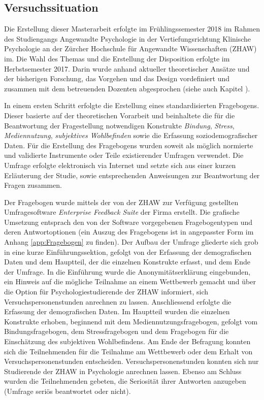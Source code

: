 \subsection{Versuchssituation}\label{sec:Versuchssituation}
Die Erstellung dieser Masterarbeit erfolgte im Frühlingssemester 2018 im Rahmen des Studiengangs Angewandte Psychologie in der Vertiefungsrichtung Klinische Psychologie an der Zürcher Hochschule für Angewandte Wissenschaften (ZHAW) im. Die Wahl des Themas und die Erstellung der Disposition erfolgte im Herbstsemester 2017. Darin wurde anhand aktueller theoretischer Ansätze und der bisherigen Forschung, das Vorgehen und das Design vordefiniert und zusammen mit dem betreuenden Dozenten abgesprochen (siehe auch Kapitel \textit{}). 

In einem ersten Schritt erfolgte die Erstellung eines standardisierten Fragebogens. Dieser basierte auf der theoretischen Vorarbeit und beinhaltete die für die Beantwortung der Fragestellung notwendigen Konstrukte \textit{Bindung}, \textit{Stress}, \textit{Mediennutzung}, \textit{subjektives Wohlbefinden} sowie die Erfassung soziodemografischer Daten. Für die Erstellung des Fragebogens wurden soweit als möglich normierte und validierte Instrumente oder Teile existierender Umfragen verwendet. Die Umfrage erfolgte elektronisch via Internet und setzte sich aus einer kurzen Erläuterung der Studie, sowie entsprechenden Anweisungen zur Beantwortung der Fragen zusammen. 

Der Fragebogen wurde mittels der von der ZHAW zur Verfügung gestellten Umfragesoftware \textit{Enterprise Feedback Suite} der Firma  erstellt. Die grafische Umsetzung entsprach den von der Software vorgegebenen Fragebogentypen und deren Antwortoptionen (ein Auszug des Fragebogens ist in angepasster Form im Anhang \ref{app:Fragebogen} zu finden). Der Aufbau der Umfrage gliederte sich grob in eine kurze Einführungssektion, gefolgt von der Erfassung der demografischen Daten und dem Hauptteil, der die einzelnen Konstrukte erfasst, und dem Ende der Umfrage. In die Einführung wurde die Anonymitätserklärung eingebunden, ein Hinweis auf die mögliche Teilnahme an einem  Wettbewerb gemacht und über die Option für Psychologiestudierende der ZHAW informiert, sich Versuchspersonenstunden anrechnen zu lassen. Anschliessend erfolgte die Erfassung der demografischen Daten. Im Hauptteil wurden die einzelnen Konstrukte erhoben, beginnend mit dem Mediennutzungs\-fragebogen, gefolgt vom Bindungsfragebogen, dem Stressfragebogen und dem Fragebogen für die Einschätzung des subjektiven Wohlbefindens. Am Ende der Befragung konnten sich die Teilnehmenden für die Teilnahme am Wettbewerb oder dem Erhalt von Versuchs\-personenstunden entscheiden. Versuchs\-personenstunden konnten sich nur Studierende der ZHAW in Psychologie anrechnen lassen. Ebenso am Schluss wurden die Teilnehmenden gebeten, die Seriosität ihrer Antworten anzugeben (Umfrage seriös beantwortet oder nicht). 

